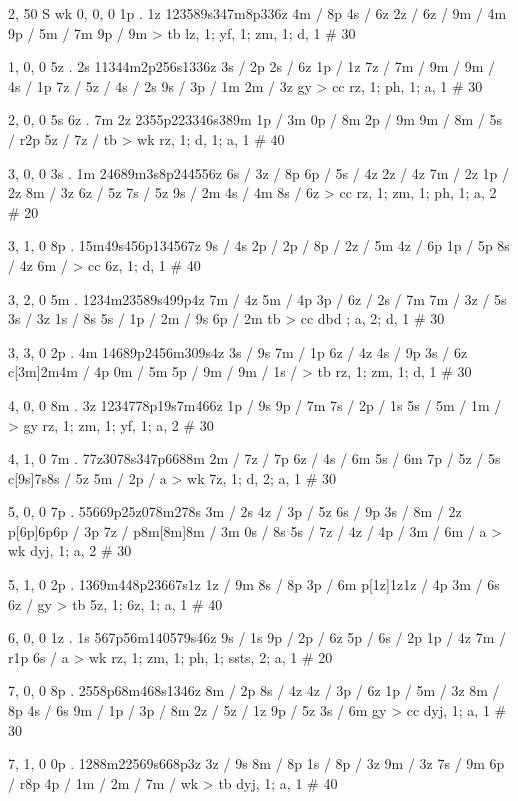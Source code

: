 2, 50
S
wk
0, 0, 0
1p . 1z
123589s347m8p336z
4m / 8p
4s / 6z
2z /
6z /
9m / 4m
9p /
5m / 7m
9p / 9m
> tb
lz, 1; yf, 1; zm, 1; d, 1 # 30

1, 0, 0
5z . 2s
11344m2p256s1336z
3s / 2p
2s / 6z
1p / 1z
7z /
7m /
9m /
9m /
4s / 1p
7z /
5z /
4s / 2s
9s /
3p / 1m
2m / 3z
gy > cc
rz, 1; ph, 1; a, 1 # 30

2, 0, 0
5s 6z . 7m 2z
2355p223346s389m
1p / 3m
0p / 8m
2p / 9m
9m /
8m /
5s / r2p
5z /
7z /
tb > wk
rz, 1; d, 1; a, 1 # 40

3, 0, 0
3s . 1m
24689m3s8p244556z
6s /
3z / 8p
6p /
5s / 4z
2z / 4z
7m / 2z
1p / 2z
8m / 3z
6z / 5z
7s / 5z
9s / 2m
4s / 4m
8s / 6z
> cc
rz, 1; zm, 1; ph, 1; a, 2 # 20

3, 1, 0
8p . 
15m49s456p134567z
9s / 4s
2p /
2p /
8p /
2z / 5m
4z / 6p
1p / 5p
8s / 4z
6m /
> cc
6z, 1; d, 1 # 40

3, 2, 0
5m . 
1234m23589s499p4z
7m / 4z
5m / 4p
3p / 
6z / 
2s / 7m
7m / 
3z / 5s
3s / 3z
1s / 8s
5s / 
1p / 
2m / 9s
6p / 2m
tb > cc
dbd ; a, 2; d, 1 # 30

3, 3, 0
2p . 4m
14689p2456m309s4z
3s / 9s
7m / 1p
6z / 4z
4s / 9p
3s / 6z
c[3m]2m4m / 4p
0m / 5m
5p / 
9m / 
9m / 
1s / 
> tb
rz, 1; zm, 1; d, 1 # 30

4, 0, 0
8m . 3z
1234778p19s7m466z
1p / 9s
9p / 7m
7s / 
2p / 1s
5s / 
5m / 
1m / 
> gy
rz, 1; zm, 1; yf, 1; a, 2 # 30

4, 1, 0
7m . 
77z3078s347p6688m
2m / 
7z / 7p
6z / 
4s / 6m
5s / 6m
7p / 
5z / 5s
c[9s]7s8s / 5z
5m / 
2p / a
> wk
7z, 1; d, 2; a, 1 # 30

5, 0, 0
7p . 
55669p25z078m278s
3m / 2s
4z / 
3p / 5z
6s / 9p
3s / 
8m / 2z
p[6p]6p6p / 3p
7z / 
p8m[8m]8m / 3m
0s / 8s
5s / 
7z / 
4z / 
4p / 
3m / 
6m / a
> wk
dyj, 1; a, 2 # 30

5, 1, 0
2p . 
1369m448p23667s1z
1z / 9m
8s / 8p
3p / 6m
p[1z]1z1z / 4p
3m / 6s
6z / 
gy > tb
5z, 1; 6z, 1; a, 1 # 40

6, 0, 0
1z . 1s
567p56m140579s46z
9s / 1s
9p / 
2p / 6z
5p / 
6s / 2p 
1p / 4z 
7m / r1p 
6s / a
> wk
rz, 1; zm, 1; ph, 1; ssts, 2; a, 1 # 20

7, 0, 0
8p . 
2558p68m468s1346z
8m / 2p 
8s / 4z 
4z / 
3p / 6z 
1p / 
5m / 3z 
8m / 8p 
4s / 6s 
9m / 
1p / 
3p / 8m 
2z / 
5z / 1z 
9p / 5z 
3s / 6m 
gy > cc
dyj, 1; a, 1 # 30

7, 1, 0
0p . 
1288m22569s668p3z
3z / 9s
8m / 8p 
1s / 
8p / 3z 
9m / 3z 
7s / 9m 
6p / r8p 
4p / 
1m / 
2m / 
7m / 
wk > tb 
dyj, 1; a, 1 # 40
